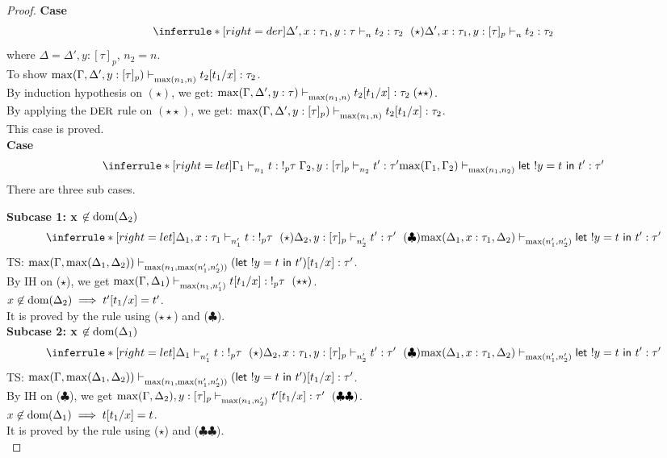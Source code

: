 \documentclass{article}
\begin{document}
\begin{proof}
\noindent \textbf{Case} 
$$
   \inferrule*[ right = der ]
   {\Delta', x:\tau_1, y: \tau \jtype{n}{}{t_2}{ \tau_2 }~ (\star)}
   { \Delta' ,  x:\tau_1, y: [\tau]_p \jtype{n}{}{t_2}{\tau_2}  }
$$
where $\Delta = \Delta', y: [\tau]_p$, $n_2 = n$.\\
To show $\max(\Gamma, \Delta', y: [\tau]_p) \mathrel{\vdash_{\max(n_1, n)}^{} {t_2[t_1/x]} : {\tau_2}}$.\\
By induction hypothesis on $(\star)$, we get:
$\max(\Gamma, \Delta', y: \tau) \jtype{\max(n_1, n)}{}{t_2[t_1/x]}{\tau_2} (\star \star)$.\\
By applying the $\mbox{\small{DER}}$ rule on $(\star \star)$, we get:
$\max(\Gamma, \Delta', y: [\tau]_p) \mathrel{\vdash_{\max(n_1, n)}^{} {t_2[t_1/x]} : {\tau_2}}$.\\
This case is proved.\\


\noindent \textbf{Case} 
\[
   \inferrule*[ right = let ]
   {\Gamma_1 \jtype{n_1}{}{t}{!_p \tau} \\ \Gamma_2, y: [\tau]_p \jtype{n_2}{}{t'}{\tau'}}
   { \max(\Gamma_1, \Gamma_2) \jtype{\max(n_1,n_2)}{}{\letx{!y}{t}{t'}}{\tau'}  }
\]
There are three sub cases.

\textbf{Subcase 1: x $\not \in \text{dom}(\Delta_2)$ }
\[
   \inferrule*[ right = let ]
   {\Delta_1, x: \tau_1 \jtype{n_1'}{}{t}{!_p \tau}~(\star) \\ \Delta_2, y: [\tau]_p \jtype{n_2'}{}{t'}{\tau'}~(\clubsuit)}
   {  \max(\Delta_1, x: \tau_1, \Delta_2) \jtype{\max(n_1',n_2')}{}{\letx{!y}{t}{t'}}{\tau'}  }
\]
 TS: $ \max(\Gamma, \max(\Delta_1,\Delta_2) ) \mathrel{\vdash_{\max(n_1,\max(n_1',n_2') )}^{} {  (\mathrel{ \mathsf{let}\ {!y} = {t} \ \mathsf{in} \ {t'} })[t_1/x] } : {\tau'}}  $. \\
 By IH on ($\star$), we get $\max(\Gamma, \Delta_1) \jtype{\max(n_1,n_1') }{}{t[t_1/x]}{!_p \tau}~(\star\star) $. \\
 $x \not \in \text{dom}(\Delta_2) \implies t'[t_1/x] =  t'$.\\
 It is proved by the rule  using ($\star\star$) and ($\clubsuit$). \\

\textbf{Subcase 2: x $\not \in \text{dom}(\Delta_1)$ }
\[
   \inferrule*[ right = let ]
   {\Delta_1 \jtype{n_1'}{}{t}{!_p \tau}~(\star) \\ \Delta_2, x: \tau_1, y: [\tau]_p \jtype{n_2'}{}{t'}{\tau'}~(\clubsuit)}
   {  \max(\Delta_1, x: \tau_1, \Delta_2) \jtype{\max(n_1',n_2')}{}{\letx{!y}{t}{t'}}{\tau'}  }
\]
 TS: $ \max(\Gamma, \max(\Delta_1,\Delta_2) ) \mathrel{\vdash_{\max(n_1,\max(n_1',n_2') )}^{} {  (\mathrel{ \mathsf{let}\ {!y} = {t} \ \mathsf{in} \ {t'} })[t_1/x] } : {\tau'}}  $. \\
By IH on ($\clubsuit$), we get $\max(\Gamma, \Delta_2),y:[\tau]_p \mathrel{\vdash_{\max(n_1,n_2') }^{} {t'[t_1/x]} : {\tau'}}~(\clubsuit\clubsuit) $. \\
 $x \not \in \text{dom}(\Delta_1) \implies t[t_1/x] = t $.\\
It is proved by the rule  using ($\star$) and ($\clubsuit\clubsuit$). \\


\end{proof}
\end{document}
